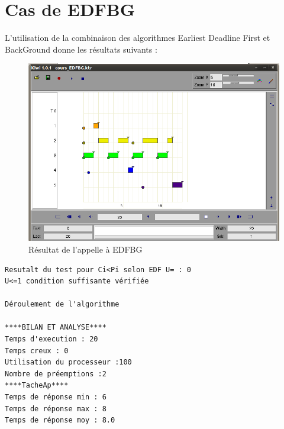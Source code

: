 \section{Cas de EDFBG}
L'utilisation de la combinaison des algorithmes Earliest Deadline First et BackGround donne les résultats suivants : 
\begin{figure}[htbp]
  \centering
  \includegraphics[scale=0.60]{img/EDFBG}
  \caption{Résultat de l'appelle à EDFBG}
  \label{fig:EDFBG}
\end{figure}

\begin{verbatim}
Resutalt du test pour Ci<Pi selon EDF U= : 0
U<=1 condition suffisante vérifiée

Déroulement de l'algorithme

****BILAN ET ANALYSE****
Temps d'execution : 20
Temps creux : 0
Utilisation du processeur :100
Nombre de préemptions :2
****TacheAp****
Temps de réponse min : 6
Temps de réponse max : 8
Temps de réponse moy : 8.0
\end{verbatim}

